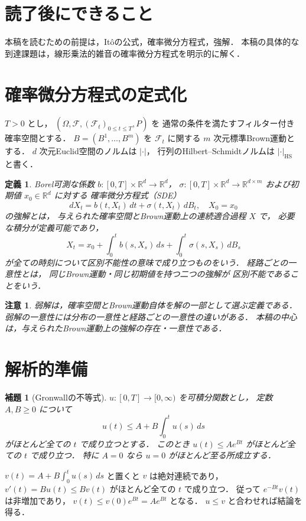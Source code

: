 \documentclass[a5paper,10pt,onecolumn]{jsarticle}
\makeatletter
\theoremstyle{mathnotetheorem}
\newtheorem{definition}[theorem]{定義}
\newtheorem{lemma}[theorem]{補題}
\newtheorem{remark}[theorem]{注意}
\renewcommand{\proofname}{証明}
\renewenvironment{proof}[1][\proofname]{%
  \par\pushQED{\qed}\normalfont\topsep4\p@\@plus2\p@\relax
  \trivlist\item[\hskip\labelsep\bfseries #1]\ignorespaces
}{\popQED\endtrivlist\@endpefalse}
\makeatother
\begin{document}
\section*{読了後にできること}
本稿を読むための前提は，Itôの公式，確率微分方程式，強解．
本稿の具体的な到達課題は，線形乗法的雑音の確率微分方程式を明示的に解く．

\section{確率微分方程式の定式化}

$T>0$ とし，
$(\Omega,\mathcal F,(\mathcal F_t)_{0\le t\le T},P)$ を
通常の条件を満たすフィルター付き確率空間とする．
$B=(B^1,\dots,B^m)$ を $\mathcal F_t$ に関する
$m$ 次元標準Brown運動とする．
$d$ 次元Euclid空間のノルムは $|\cdot|$，
行列のHilbert--Schmidtノルムは $|\cdot|_{\mathrm{HS}}$
と書く．

\begin{definition}
Borel可測な係数
$b:[0,T]\times\mathbb R^d\to\mathbb R^d$，
$\sigma:[0,T]\times\mathbb R^d\to\mathbb R^{d\times m}$
および初期値 $x_0\in\mathbb R^d$ に対する
確率微分方程式（SDE）
\[
 dX_t=b(t,X_t)\,dt+\sigma(t,X_t)\,dB_t,\quad X_0=x_0
\]
の\emph{強解}とは，
与えられた確率空間とBrown運動上の連続適合過程 $X$ で，
必要な積分が定義可能であり，
\begin{equation}\label{eq:sde}
 X_t=x_0+\int_0^tb(s,X_s)\,ds+
       \int_0^t\sigma(s,X_s)\,dB_s
\end{equation}
が全ての時刻について区別不能性の意味で成り立つものをいう．
\emph{経路ごとの一意性}とは，
同じBrown運動・同じ初期値を持つ二つの強解が
区別不能であることをいう．
\end{definition}

\begin{remark}
弱解は，確率空間とBrown運動自体を解の一部として選ぶ定義である．
弱解の一意性には分布の一意性と経路ごとの一意性の違いがある．
本稿の中心は，与えられたBrown運動上の強解の存在・一意性である．
\end{remark}

\section{解析的準備}

\begin{lemma}[Gronwallの不等式]\label{lem:gronwall}
$u:[0,T]\to[0,\infty)$ を可積分関数とし，
定数 $A,B\ge0$ について
\[
 u(t)\le A+B\int_0^tu(s)\,ds
\]
がほとんど全ての $t$ で成り立つとする．
このとき $u(t)\le Ae^{Bt}$ がほとんど全ての $t$ で成り立つ．
特に $A=0$ なら $u=0$ がほとんど至る所成立する．
\end{lemma}
\begin{proof}
$v(t)=A+B\int_0^tu(s)\,ds$ と置くと
$v$ は絶対連続であり，
$v'(t)=Bu(t)\le Bv(t)$ がほとんど全ての $t$ で成り立つ．
従って $e^{-Bt}v(t)$ は非増加であり，
$v(t)\le v(0)e^{Bt}=Ae^{Bt}$ となる．
$u\le v$ と合わせれば結論を得る．
\end{proof}
\end{document}
